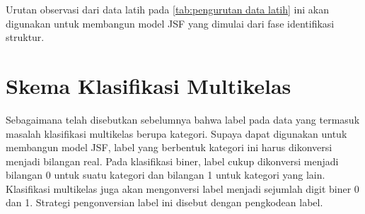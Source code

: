 \begin{contoh}
\begin{table}[ht!]
    \centering 
    \caption{Contoh data latih yang telah diurutkan}
    \label{tab:pengurutan data latih}
\end{table}

\noindent Urutan observasi dari data latih pada \ref{tab:pengurutan data latih} ini akan digunakan untuk membangun model JSF yang dimulai dari fase identifikasi struktur.
\end{contoh}

\section{Skema Klasifikasi Multikelas} \label{skema klasifikasi}
\noindent Sebagaimana telah disebutkan sebelumnya bahwa label pada data yang termasuk masalah klasifikasi multikelas berupa kategori. Supaya dapat digunakan untuk membangun model JSF, label yang berbentuk kategori ini harus dikonversi menjadi bilangan real. Pada klasifikasi biner, label cukup dikonversi menjadi bilangan 0 untuk suatu kategori dan bilangan 1 untuk kategori yang lain. Klasifikasi multikelas juga akan mengonversi label menjadi sejumlah digit biner 0 dan 1. Strategi pengonversian label ini disebut dengan pengkodean label. 

